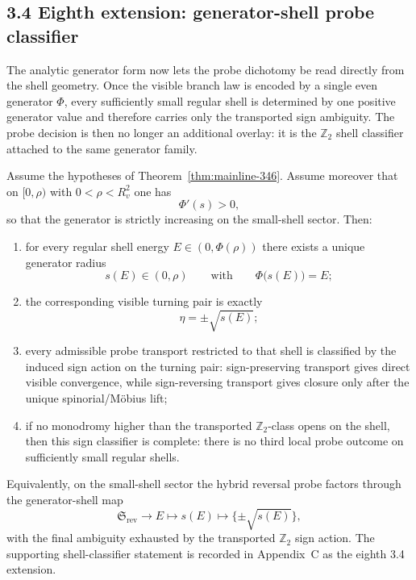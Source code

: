 \subsection*{3.4 Eighth extension: generator-shell probe classifier}
The analytic generator form now lets the probe dichotomy be read directly from the shell geometry. Once the visible branch law is encoded by a single even generator $\Phi$, every sufficiently small regular shell is determined by one positive generator value and therefore carries only the transported sign ambiguity. The probe decision is then no longer an additional overlay: it is the $\mathbb Z_2$ shell classifier attached to the same generator family.

\begin{theorem}
\label{thm:mainline-347}
Assume the hypotheses of Theorem~\ref{thm:mainline-346}. Assume moreover that on $[0,\rho)$ with $0<\rho<R_v^2$ one has
\[
  \Phi'(s)>0,
\]
so that the generator is strictly increasing on the small-shell sector. Then:
\begin{enumerate}[label=(\roman*)]
  \item for every regular shell energy $E\in(0,\Phi(\rho))$ there exists a unique generator radius
  \[
    s(E)\in(0,\rho)
    \qquad\text{with}\qquad
    \Phi\bigl(s(E)\bigr)=E;
  \]
  \item the corresponding visible turning pair is exactly
  \[
    \eta=\pm\sqrt{s(E)};
  \]
  \item every admissible probe transport restricted to that shell is classified by the induced sign action on the turning pair: sign-preserving transport gives direct visible convergence, while sign-reversing transport gives closure only after the unique spinorial/M\"obius lift;
  \item if no monodromy higher than the transported $\mathbb Z_2$-class opens on the shell, then this sign classifier is complete: there is no third local probe outcome on sufficiently small regular shells.
\end{enumerate}
Equivalently, on the small-shell sector the hybrid reversal probe factors through the generator-shell map
\[
  \mathfrak S_{\mathrm{rev}}
  \longrightarrow
  E
  \longmapsto
  s(E)
  \longmapsto
  \{\pm\sqrt{s(E)}\},
\]
with the final ambiguity exhausted by the transported $\mathbb Z_2$ sign action.
The supporting shell-classifier statement is recorded in Appendix~C as the eighth 3.4 extension.
\end{theorem}

